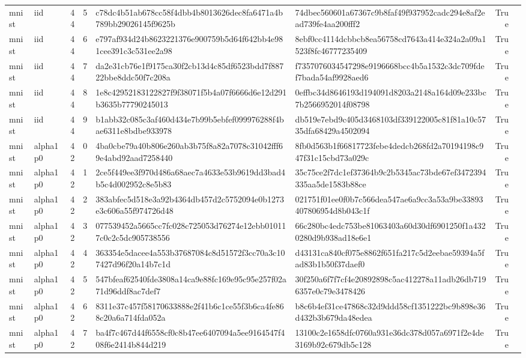 \begin{tabular}{llrrllrl}
mnist & iid & 44 & 5 & c78dc4b51ab678cc58f4dbb4b8013626dec8fa6471a4b789bb29026145f9625b & 74dbec560601a67367c9b8faf49f937952cadc294e8af2ead739fe4aa200fff2 & True &  \\
mnist & iid & 44 & 6 & e797af934d24b8623221376e900759b5d64f642bb4e981cee391c3c531ee2a98 & 8ebf0cc4114dcbbcb8ea56758cd7643a414e324a2a09a1523f8fc46777235409 & True &  \\
mnist & iid & 44 & 7 & da2e31cb76e1f9175ca30f2cb13d4c85df6523bdd7f88722bbe8ddc50f7c208a & f7357076034547298e9196668bcc4b5a1532c3dc709fdef7bada54af9928aed6 & True &  \\
mnist & iid & 44 & 8 & 1e8c42952183122827f9f38071f5b4a07f6666d6e12d291b3635b77790245013 & 0effbc34d8646193d194091d8203a2148a164d09e233bc7b2566952014f08798 & True &  \\
mnist & iid & 44 & 9 & b1abb32c085c3af460d434e7b99b5ebfef099976288f4bae6311e8bdbe933978 & db519e7ebd9c405d3468103df339122005c81f81a10c5735dfa68429a4502094 & True &  \\
mnist & alpha1p0 & 42 & 0 & 4ba0cbe79a40b806e260ab3b75f8a82a7078c31042fff69e4abd92aad7258440 & 8fb0d563b1f66817723febe4dedcb268fd2a70194198c947f31c15cbd73a029c & True &  \\
mnist & alpha1p0 & 42 & 1 & 2ce5f449ee3f970d486a68aec7a4633e53b9619dd3bad4b5c4d002952c8e5b83 & 35c75ce2f7dc1ef37364b9c2b5345ac73bde67ef3472394335aa5de1583b88ce & True &  \\
mnist & alpha1p0 & 42 & 2 & 383abfec5d518e3a92b4364db457d2c5752094e0b1273e3c606a55f974726d48 & 021751f01ee0f0b7c566dea547ae6a9cc3a53a9be33893407806954d8b043c1f & True &  \\
mnist & alpha1p0 & 42 & 3 & 077539452a5665cc7fc028c725053d76274e12ebb010117c0c2c5dc905738556 & 66c280bc4edc753be81063403a60d30df6901250f1a4320280d9b938ad18e6e1 & True &  \\
mnist & alpha1p0 & 42 & 4 & 363354e5dacee4a553b37687084c8d51572f3cc70a3c107427d96f20a14b7c1d & d43131ca840cf075e8862f651fa217c5d2eebae59394a5fad83b1b50f37daef0 & True &  \\
mnist & alpha1p0 & 42 & 5 & 547bfeaf62540fde3808a14ca9e88fc169e95c95e257f02a71d96ddf8ac7def7 & 30f250a6f7f7cf4e20892898c5ac412278a11adb26db7196357e0c79e3478426 & True &  \\
mnist & alpha1p0 & 42 & 6 & 8311e37c457f58170633888e2f41b6c1ce55f3b6ca4fe868c20a6a714fda052a & b8c6b4ef31ce47868c32d9ddd58cf1351222bc9b898e36d432b3b679da48edea & True &  \\
mnist & alpha1p0 & 42 & 7 & ba4f7c467d44f6558cf0c8b47ee6407094a5ee9164547f408f6e2414b844d219 & 13100c2e1658dfc0760a931e36dc378d057a6971f2e4de3169b92c679db5c128 & True &  \\

\end{tabular}
